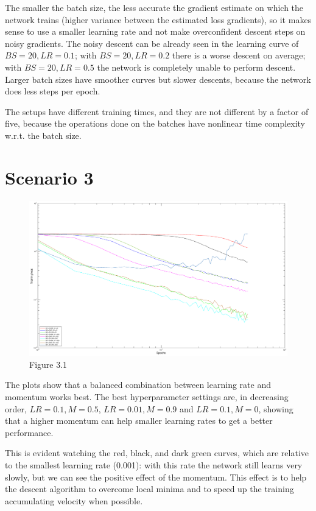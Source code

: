 \documentclass{article}
\begin{document}
    The smaller the batch size, the less accurate the gradient estimate on which the network trains (higher variance between the estimated loss gradients), so it makes sense to use a smaller learning rate
    and not make overconfident descent steps on noisy gradients. The noisy descent can be already seen in the learning curve of $BS = 20, LR = 0.1$; with $BS = 20, LR = 0.2$ there is a worse descent on average; 
    with $BS = 20, LR = 0.5$ the network is completely unable to perform descent. Larger batch sizes have smoother curves but slower descents, because the network does less steps per epoch.
    
    The setups have different training times, and they are not different by a factor of five, because the operations done on the batches have nonlinear time complexity w.r.t. the batch size.
    
    
    
\section*{Scenario 3}
	\begin{figure}[!htb]
        \centering
        \includegraphics[width=\textwidth]{figures/sc3_tr_loss}
        \captionsetup{labelformat=empty}
        \caption{Figure 3.1}
    \end{figure}
    
    The plots show that a balanced combination between learning rate and momentum works best. The best hyperparameter settings are, in decreasing order, 
    $LR = 0.1, M = 0.5$, $LR = 0.01, M = 0.9$ and $LR = 0.1, M = 0$, showing that a higher momentum can help smaller learning rates to get a better performance. 
    
    This is evident watching the red, black, and dark green curves, which are relative to the smallest learning rate (0.001): with this rate the network still learns very slowly, but we can see the positive effect of the momentum. 
    This effect is to help the descent algorithm to overcome local minima and to speed up the training accumulating velocity when possible.
    
\end{document}
